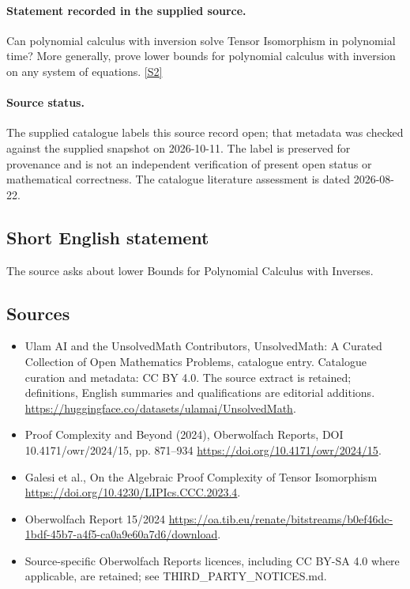 \documentclass[11pt]{article}
\begin{document}
\paragraph{Statement recorded in the supplied source.}
Can polynomial calculus with inversion solve Tensor Isomorphism in polynomial time? More generally, prove lower bounds for polynomial calculus with inversion on any system of equations. \href{https://doi.org/10.4171/owr/2024/15}{[S2]}
\paragraph{Source status.}
The supplied catalogue labels this source record open; that metadata was checked against the supplied snapshot on 2026-10-11. The label is preserved for provenance and is not an independent verification of present open status or mathematical correctness. The catalogue literature assessment is dated 2026-08-22.
\subsection{Short English statement}
The source asks about lower Bounds for Polynomial Calculus with Inverses.
\subsection{Sources}
\begin{itemize}
\item[S1] Ulam AI and the UnsolvedMath Contributors, UnsolvedMath: A Curated Collection of Open Mathematics Problems, catalogue entry. Catalogue curation and metadata: CC BY 4.0. The source extract is retained; definitions, English summaries and qualifications are editorial additions.
\url{https://huggingface.co/datasets/ulamai/UnsolvedMath}.
\item[S2] Proof Complexity and Beyond (2024), Oberwolfach Reports, DOI 10.4171/owr/2024/15, pp. 871--934
\url{https://doi.org/10.4171/owr/2024/15}.
\item[S3] Galesi et al., On the Algebraic Proof Complexity of Tensor Isomorphism
\url{https://doi.org/10.4230/LIPIcs.CCC.2023.4}.
\item[S4] Oberwolfach Report 15/2024
\url{https://oa.tib.eu/renate/bitstreams/b0ef46dc-1bdf-45b7-a4f5-ca0a9e60a7d6/download}.
\item Source-specific Oberwolfach Reports licences, including CC BY-SA 4.0 where applicable, are retained; see THIRD\_PARTY\_NOTICES.md.
\end{itemize}
\end{document}
